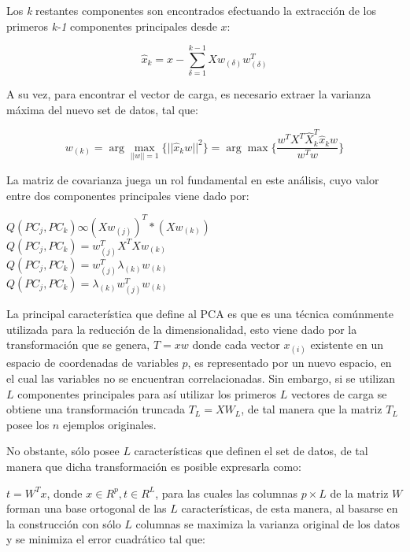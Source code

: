 Los \textit{k} restantes componentes son encontrados efectuando la extracción de los primeros \textit{k-1} componentes principales desde $x$:

\begin{equation}
	\hat{x}_{k} = x - \sum_{\delta=1}^{k-1}Xw_{(\delta)}w^{T}_{(\delta)}
\end{equation}

A su vez, para encontrar el vector de carga, es necesario extraer la varianza máxima del nuevo set de datos, tal que:

\begin{equation}
	w_{(k)} = \arg \max_{||w||=1} \{||\hat{x}_{k}w||^{2}\} = \arg \max \{\frac{w^{T}X^{T}\hat{X}^{T}_{k}\hat{x}_{k}w}{w^{T}w}\}
\end{equation}

La matriz de covarianza juega un rol fundamental en este análisis, cuyo valor entre dos componentes principales viene dado por:
\begin{center}
	$Q(PC_{j}, PC_{k}) \infty (Xw_{(j)})^{T} * (Xw_{(k)})$\\
	$Q(PC_{j}, PC_{k}) = w_{(j)}^{T}X^{T}Xw_{(k)}$\\
	$Q(PC_{j}, PC_{k}) = w_{(j)}^{T}\lambda_{(k)}w_{(k)}$\\
	$Q(PC_{j}, PC_{k}) = \lambda_{(k)}w_{(j)}^{T}w_{(k)}$	
\end{center}


La principal característica que define al PCA es que es una técnica comúnmente utilizada para la reducción de la dimensionalidad, esto viene dado por la transformación que se genera, $ T = xw $ donde cada vector $ x_{(i)} $ existente en un espacio de coordenadas de variables $p$, es representado por un nuevo espacio, en el cual las variables no se encuentran correlacionadas. Sin embargo, si se utilizan $ L $ componentes principales para así utilizar los primeros $ L $ vectores de carga se obtiene una transformación truncada $ T_{L} = XW_{L} $, de tal manera que la matriz $ T_{L} $ posee los $n$ ejemplos originales. 

No obstante, sólo posee $ L $ características que definen el set de datos, de tal manera que dicha transformación es posible expresarla como:

$ t = W^{T}x$, donde $ x \in R^{p}, t \in R^{L}$, para las cuales las columnas $ p \times L $ de la matriz $ W $ forman una base ortogonal de las $ L $ características, de esta manera, al basarse en la construcción con sólo $ L $ columnas se maximiza la varianza original de los datos y se minimiza el error cuadrático tal que: 


